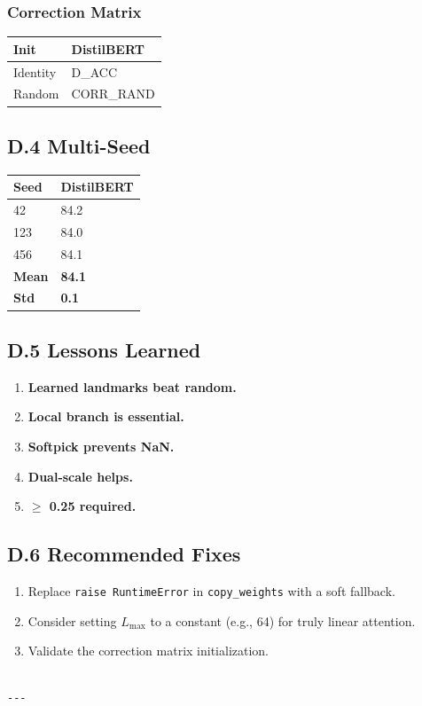 \subsubsection{Correction Matrix}

\begin{table}[H]
\centering
\small
\begin{tabular}{ll}
\toprule
\textbf{Init} & \textbf{DistilBERT} \\
\midrule
Identity & {{D\_ACC}} \\
Random & {{CORR\_RAND}} \\
\bottomrule
\end{tabular}
\end{table}

\subsection{D.4 Multi-Seed}

\begin{table}[H]
\centering
\small
\begin{tabular}{ll}
\toprule
\textbf{Seed} & \textbf{DistilBERT} \\
\midrule
42 & 84.2 \\
123 & 84.0 \\
456 & 84.1 \\
\textbf{Mean} & \textbf{84.1} \\
\textbf{Std} & \textbf{0.1} \\
\bottomrule
\end{tabular}
\end{table}

\subsection{D.5 Lessons Learned}

\begin{enumerate}
\item \textbf{Learned landmarks beat random.}
\item \textbf{Local branch is essential.}
\item \textbf{Softpick prevents NaN.}
\item \textbf{Dual-scale helps.}
\item \textbf{  $\ge$ 0.25 required.}

\end{enumerate}
\subsection{D.6 Recommended Fixes}

\begin{enumerate}
\item Replace \texttt{raise RuntimeError} in \texttt{copy\_weights} with a soft fallback.
\item Consider setting $L_\text{max}$ to a constant (e.g., 64) for truly
  linear attention.
\item Validate the correction matrix initialization.
\end{enumerate}
\begin{lstlisting}

---
\end{lstlisting}